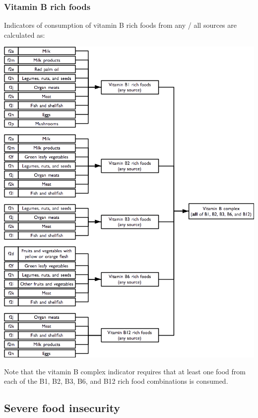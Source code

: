 \documentclass[12pt,a4paper]{book}
\theoremstyle{definition}
\theoremstyle{definition}
\theoremstyle{definition}
\theoremstyle{remark}
\begin{document}
\hypertarget{vitamin-b-rich-foods}{%
\subsubsection{Vitamin B rich foods}\label{vitamin-b-rich-foods}}

Indicators of consumption of vitamin B rich foods from any / all sources
are calculated as:

\begin{center}\includegraphics{figures/indicators14} \end{center}

Note that the vitamin B complex indicator requires that at least one
food from each of the B1, B2, B3, B6, and B12 rich food combinations is
consumed.

\hypertarget{severe-food-insecurity}{%
\subsection{Severe food insecurity}\label{severe-food-insecurity}}
\end{document}
